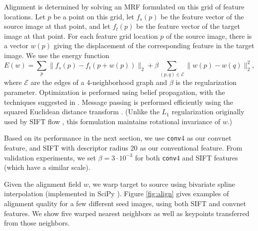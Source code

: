 \documentclass{article} \usepackage{nips14submit_e,times}
\begin{document}
Alignment is determined by solving an MRF formulated on this grid of feature
locations.
Let $p$ be a point on this grid, let $f_s(p)$ be the feature vector of the
source image at that point, and let $f_t(p)$ be the feature vector of the target
image at that point.
For each feature grid location $p$ of the source image, there is a vector $w(p)$
giving the displacement of the corresponding feature in the target image.
We use the energy function
\[
E(w) = \sum_p \| f_s(p) - f_t(p + w(p)) \|_2 +
\beta \sum_{(p, q) \in \mathcal E} \| w(p) - w(q) \|_2^2,
\]
where $\mathcal E$ are the edges of a 4-neighborhood graph and $\beta$ is the
regularization parameter.
Optimization is performed using belief propagation, with the techniques
suggested in \cite{FHBP}.
Message passing is performed efficiently using the squared Euclidean distance
transform \cite{FHDT}.
(Unlike the $L_1$ regularization originally used by SIFT flow \cite{sift-flow},
this formulation maintains rotational invariance of $w$.)

Based on its performance in the next section, we use \texttt{conv}4 as our
convnet feature, and SIFT with descriptor radius 20 as our conventional feature.
From validation experiments, we set $\beta = 3 \cdot 10^{-3}$ for both
\texttt{conv}4 and SIFT features (which have a similar scale).

Given the alignment field $w$, we warp target to source using bivariate spline
interpolation (implemented in SciPy \cite{scipy}).
Figure \ref{fig:align} gives examples of alignment quality for a few different
seed images, using both SIFT and convnet features.
We show five warped nearest neighbors as well as keypoints transferred
from those neighbors.
\end{document}
